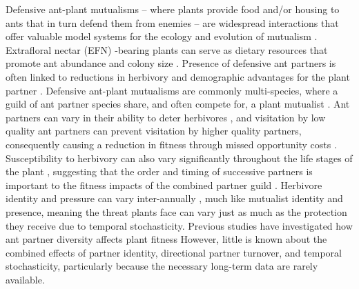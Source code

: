 \documentclass[11pt]{article}
\begin{document}
Defensive ant-plant mutualisms -- where plants provide food and/or housing to ants that in turn defend them from enemies -- are widespread interactions that offer valuable model systems for the ecology and evolution of mutualism \citep{Bronstein1998, Bronstein2006}. 
Extrafloral nectar (EFN) -bearing plants can serve as dietary resources that promote ant abundance and colony size \citep{Byk2011, Ness2009, Ness2006, Donald2022}.
Presence of defensive ant partners is often linked to reductions in herbivory  \citep{Trager2010, Rudgers2004} and demographic advantages for the plant partner \citep{Baez2016}.
Defensive ant-plant mutualisms are commonly multi-species, where a guild of ant partner species share, and often compete for, a plant mutualist \citep{Bronstein1998, Beattie1985, Trager2010, Agrawal1998}.
Ant partners can vary in their ability to deter herbivores \citep{Bruna2014}, and visitation by low quality ant partners can prevent visitation by higher quality partners, consequently causing a reduction in fitness through missed opportunity costs \citep{Fraser2001, Frederickson2005}.
Susceptibility to herbivory can also vary significantly throughout the life stages of the plant \citep{Boege2005}, suggesting that the order and timing of successive partners is important to the fitness impacts of the combined partner guild \citep{Barton2010, Boege2005, Fonseca2003}.
Herbivore identity and pressure can vary inter-annually \cite{Wetzel2023}, much like mutualist identity and presence, meaning the threat plants face can vary just as much as the protection they receive due to temporal stochasticity. 
Previous studies have investigated how ant partner diversity affects plant fitness \citep{Palmer2010,Afkhami2014,Fiala1994,Gaume1998,Dattilo2014,Ludka2015}
However, little is known about the combined effects of partner identity, directional partner turnover, and temporal stochasticity, particularly because the necessary long-term data are rarely available. 
	
\end{document}
